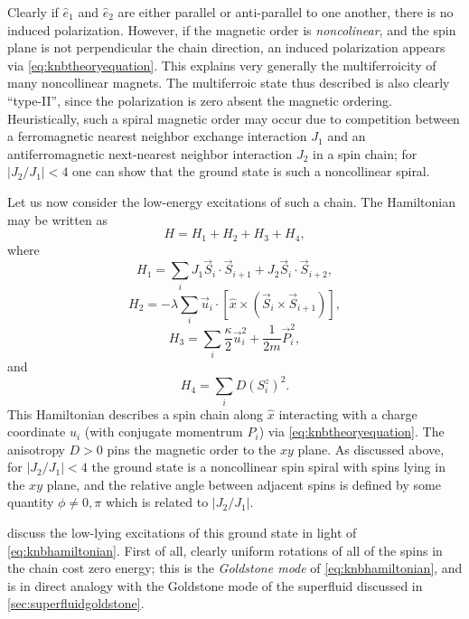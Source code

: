 Clearly if $\hat{e}_1$ and $\hat{e}_2$ are either parallel or anti-parallel to one another, there is no induced polarization.
However, if the magnetic order is \emph{noncolinear}, and the spin plane is not perpendicular the chain direction, an induced polarization appears via \cref{eq:knbtheoryequation}.
This explains very generally the multiferroicity of many noncollinear magnets.
The multiferroic state thus described is also clearly ``type-II'', since the polarization is zero absent the magnetic ordering.
Heuristically, such a spiral magnetic order may occur due to competition between a ferromagnetic nearest neighbor exchange interaction $J_1$ and an antiferromagnetic next-nearest neighbor interaction $J_2$ in a \oned spin chain; for $|J_2/J_1|<4$ one can show that the ground state is such a noncollinear spiral.

Let us now consider the low-energy excitations of such a \oned chain.
The Hamiltonian may be written as
\begin{equation}\label{eq:knbhamiltonian}
H=H_1+H_2+H_3+H_4,
\end{equation}
where
\begin{equation}
H_1 = \sum_i J_1\vec{S}_i\cdot\vec{S}_{i+1}+J_2\vec{S}_i\cdot\vec{S}_{i+2},
\end{equation}
\begin{equation}\label{eq:knbpolarizationcoupling}
H_2 = -\lambda \sum_i \vec{u}_i\cdot [\hat{x}\times (\vec{S}_i\times\vec{S}_{i+1})],
\end{equation}
\begin{equation}
H_3 = \sum_i \frac{\kappa}{2}\vec{u}_i^2+\frac{1}{2m}\vec{P}_i^2,
\end{equation}
and
\begin{equation}\label{eq:knbanisotropy}
H_4 = \sum_i D(S^z_i)^2.
\end{equation}
This Hamiltonian describes a \oned spin chain along $\hat{x}$ interacting with a charge coordinate $u_i$ (with conjugate momentrum $P_i$) via \cref{eq:knbtheoryequation}.
The anisotropy $D>0$ pins the magnetic order to the $xy$ plane.
As discussed above, for $|J_2/J_1|<4$ the ground state is a noncollinear spin spiral with spins lying in the $xy$ plane, and the relative angle between adjacent spins is defined by some quantity $\phi\neq 0,\pi$ which is related to $|J_2/J_1|$.

\citet{katsura_dynamical_2007} discuss the low-lying excitations of this ground state in light of \cref{eq:knbhamiltonian}.
First of all, clearly uniform rotations of all of the spins in the chain cost zero energy; this is the \emph{Goldstone mode} of \cref{eq:knbhamiltonian}, and is in direct analogy with the Goldstone mode of the superfluid discussed in \cref{sec:superfluidgoldstone}.

